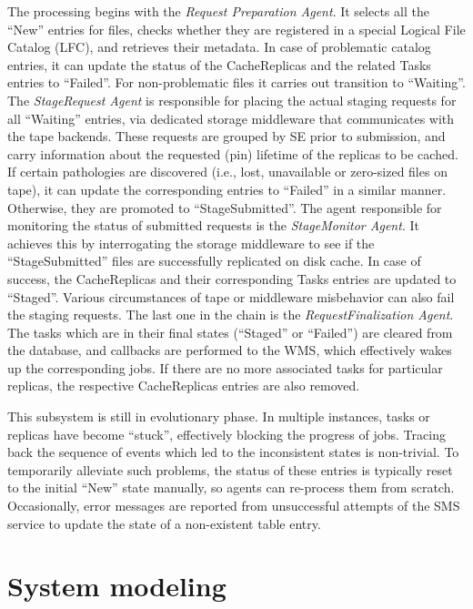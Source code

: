 \documentclass[10pt,conference]{IEEEtran}
\begin{document}
The processing begins with the \textit{Request Preparation Agent}. It selects all the
``New'' entries for files, checks whether they are registered in a special Logical
File Catalog (LFC), and retrieves their metadata. In case of problematic catalog
entries, it can update the status of the CacheReplicas and the related Tasks
entries to ``Failed''. For non-problematic files it carries out transition to
``Waiting''. The \textit{StageRequest Agent} is responsible for placing the actual staging
requests for all ``Waiting'' entries, via dedicated storage middleware that
communicates with the tape backends. These requests are grouped by SE prior to
submission, and carry information about the requested (pin) lifetime of the
replicas to be cached. If certain pathologies are discovered (i.e., lost,
unavailable or zero-sized files on tape), it can update the corresponding
entries to ``Failed'' in a similar manner. Otherwise, they are promoted to
``StageSubmitted''. The agent responsible for monitoring the status of submitted
requests is the \textit{StageMonitor Agent}. It achieves this by interrogating the
storage middleware to see if the ``StageSubmitted'' files are successfully
replicated on disk cache. In case of success, the CacheReplicas and their
corresponding Tasks entries are updated to ``Staged''. Various circumstances of
tape or middleware misbehavior can also fail the staging requests. The last one
in the chain is the \textit{RequestFinalization Agent}. The tasks which are in their
final states (``Staged'' or ``Failed'') are cleared from the database, and callbacks
are performed to the WMS, which effectively wakes up the corresponding jobs. If
there are no more associated tasks for particular replicas, the respective
CacheReplicas entries are also removed.

This subsystem is still in evolutionary phase. In multiple instances, tasks or
replicas have become “stuck”, effectively blocking the progress of jobs. Tracing
back the sequence of events which led to the inconsistent states is non-trivial.
To temporarily alleviate such problems, the status of these entries is typically
reset to the initial “New” state manually, so agents can re-process them from
scratch. Occasionally, error messages are reported from unsuccessful attempts of
the SMS service to update the state of a non-existent table entry.

\section{System modeling}
\end{document}
